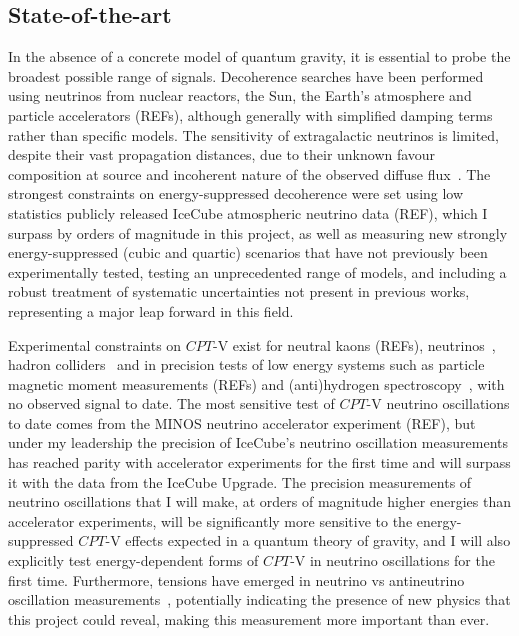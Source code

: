 \documentclass[a4paper,11pt]{article}
\begin{document}
\subsection{State-of-the-art}

In the absence of a concrete model of quantum gravity, it is essential to probe the broadest possible range of signals. Decoherence searches have been performed using neutrinos from nuclear reactors, the Sun, the Earth's atmosphere and particle accelerators (REFs), although generally with simplified damping terms rather than specific models. The sensitivity of extragalactic neutrinos is limited, despite their vast propagation distances, due to their unknown favour composition at source and incoherent nature of the observed diffuse flux~\cite{PhysRevD.102.115003}.  The strongest constraints on energy-suppressed decoherence were set using low statistics publicly released IceCube atmospheric neutrino data (REF), which I surpass by orders of magnitude in this project, as well as measuring new strongly energy-suppressed (cubic and quartic) scenarios that have not previously been experimentally tested, testing an unprecedented range of models, and including a robust treatment of systematic uncertainties not present in previous works, representing a major leap forward in this field.

Experimental constraints on $CPT$-V exist for neutral kaons (REFs), neutrinos~\cite{Adamson:2013whj, Ohlsson:2014cha}, hadron colliders~\cite{vanTilburg:2016awx} and in precision tests of low energy systems such as particle magnetic moment measurements (REFs) and (anti)hydrogen spectroscopy~\cite{Kostelecky:2015nma}, with no observed signal to date. The most sensitive test of $CPT$-V neutrino oscillations to date comes from the MINOS neutrino accelerator experiment (REF), but under my leadership the precision of IceCube's neutrino oscillation measurements has reached parity with accelerator experiments for the first time and will surpass it with the data from the IceCube Upgrade. The precision measurements of neutrino oscillations that I will make, at orders of magnitude higher energies than accelerator experiments, will be significantly more sensitive to the energy-suppressed $CPT$-V effects expected in a quantum theory of gravity, and I will also explicitly test energy-dependent forms of $CPT$-V in neutrino oscillations for the first time. Furthermore, tensions have emerged in neutrino vs antineutrino oscillation measurements~\cite{Abe:2019vii,NOvA_CP_result}, potentially indicating the presence of new physics that this project could reveal, making this measurement more important than ever. \\
\end{document}
